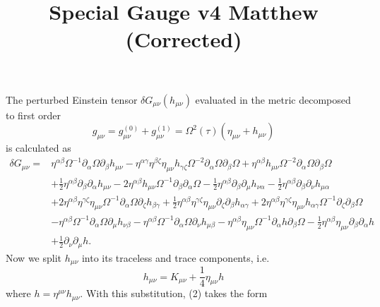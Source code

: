 \documentclass[10pt,letterpaper]{article}
\title{Special Gauge v4 Matthew (Corrected)}
\date{}
\begin{document}
\maketitle
\noindent
The perturbed Einstein tensor $\delta  G_{\mu\nu}( h_{\mu\nu})$ evaluated in the metric decomposed to first order 
\begin{equation}
g_{\mu\nu} = g^{(0)}_{\mu\nu} + g^{(1)}_{\mu\nu} = \Omega^2(\tau)(\eta_{\mu\nu}+h_{\mu\nu})
\end{equation}
is calculated as 
\begin{align}
\delta G_{\mu\nu}={}&\eta^{\alpha \beta} \Omega^{-1} \partial_{\alpha}\Omega \partial_{\beta}h_{\mu \nu}
 -  \eta^{\alpha \gamma} \eta^{\beta \zeta} \eta_{\mu \nu} h_{\gamma \zeta} \Omega^{-2} \partial_{\alpha}\Omega \partial_{\beta}\Omega
 + \eta^{\alpha \beta} h_{\mu \nu} \Omega^{-2} \partial_{\alpha}\Omega \partial_{\beta}\Omega\nonumber\\
& + \tfrac{1}{2} \eta^{\alpha \beta} \partial_{\beta}\partial_{\alpha}h_{\mu \nu}
 - 2 \eta^{\alpha \beta} h_{\mu \nu} \Omega^{-1} \partial_{\beta}\partial_{\alpha}\Omega
 -  \tfrac{1}{2} \eta^{\alpha \beta} \partial_{\beta}\partial_{\mu}h_{\nu \alpha}
 -  \tfrac{1}{2} \eta^{\alpha \beta} \partial_{\beta}\partial_{\nu}h_{\mu \alpha}\nonumber\\
& + 2 \eta^{\alpha \beta} \eta^{\gamma \zeta} \eta_{\mu \nu} \Omega^{-1} \partial_{\alpha}\Omega \partial_{\zeta}h_{\beta \gamma}
 + \tfrac{1}{2} \eta^{\alpha \beta} \eta^{\gamma \zeta} \eta_{\mu \nu} \partial_{\zeta}\partial_{\beta}h_{\alpha \gamma}
 + 2 \eta^{\alpha \beta} \eta^{\gamma \zeta} \eta_{\mu \nu} h_{\alpha \gamma} \Omega^{-1} \partial_{\zeta}\partial_{\beta}\Omega\nonumber\\
& -  \eta^{\alpha \beta} \Omega^{-1} \partial_{\alpha}\Omega \partial_{\mu}h_{\nu \beta}
 -  \eta^{\alpha \beta} \Omega^{-1} \partial_{\alpha}\Omega \partial_{\nu}h_{\mu \beta}- \eta^{\alpha \beta} \eta_{\mu \nu} \Omega^{-1} \partial_{\alpha}h \partial_{\beta}\Omega -  \tfrac{1}{2} \eta^{\alpha \beta} \eta_{\mu \nu} \partial_{\beta}\partial_{\alpha}h\nonumber \\
& + \tfrac{1}{2} \partial_{\nu}\partial_{\mu}h.
\end{align}
Now we split $h_{\mu\nu}$ into its traceless and trace components, i.e.
\begin{equation}
	h_{\mu\nu} = K_{\mu\nu} + \frac 14 \eta_{\mu\nu}h
\end{equation}
where $h = \eta^{\mu\nu}h_{\mu\nu}$. With this substitution, (2) takes the form
\end{document}
